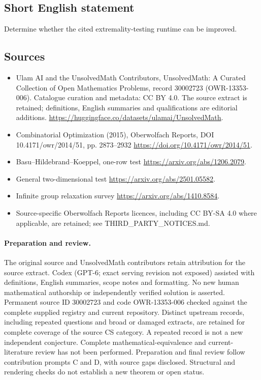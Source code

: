 \documentclass[11pt]{article}
\begin{document}
\subsection{Short English statement}
Determine whether the cited extremality-testing runtime can be improved.
\subsection{Sources}
\begin{itemize}
\item[\hypertarget{source:30002723:1}{S1}] Ulam AI and the UnsolvedMath Contributors, UnsolvedMath: A Curated Collection of Open Mathematics Problems, record 30002723 (OWR-13353-006). Catalogue curation and metadata: CC BY 4.0. The source extract is retained; definitions, English summaries and qualifications are editorial additions.
\url{https://huggingface.co/datasets/ulamai/UnsolvedMath}.
\item[\hypertarget{source:30002723:2}{S2}] Combinatorial Optimization (2015), Oberwolfach Reports, DOI 10.4171/owr/2014/51, pp. 2873--2932
\url{https://doi.org/10.4171/owr/2014/51}.
\item[\hypertarget{source:30002723:3}{S3}] Basu--Hildebrand--Koeppel, one-row test
\url{https://arxiv.org/abs/1206.2079}.
\item[\hypertarget{source:30002723:4}{S4}] General two-dimensional test
\url{https://arxiv.org/abs/2501.05582}.
\item[\hypertarget{source:30002723:5}{S5}] Infinite group relaxation survey
\url{https://arxiv.org/abs/1410.8584}.
\item Source-specific Oberwolfach Reports licences, including CC BY-SA 4.0 where applicable, are retained; see THIRD\_PARTY\_NOTICES.md.
\end{itemize}
\paragraph{Preparation and review.}
The original source and UnsolvedMath contributors retain attribution for the source extract. Codex (GPT-6; exact serving revision not exposed) assisted with definitions, English summaries, scope notes and formatting. No new human mathematical authorship or independently verified solution is asserted. Permanent source ID 30002723 and code OWR-13353-006 checked against the complete supplied registry and current repository. Distinct upstream records, including repeated questions and broad or damaged extracts, are retained for complete coverage of the source CS category. A repeated record is not a new independent conjecture. Complete mathematical-equivalence and current-literature review has not been performed. Preparation and final review follow contribution prompts C and D, with source gaps disclosed. Structural and rendering checks do not establish a new theorem or open status.
\label{end:30002723}
\end{document}
